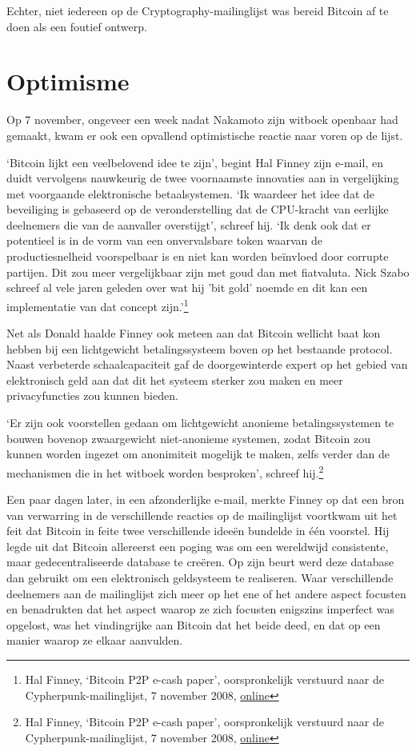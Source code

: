 \documentclass[
  a5paper,
  smalldemyvopaper,11pt,twoside,onecolumn,openright,extrafontsizes]{memoir}
\begin{document}
Echter, niet iedereen op de Cryptography-mailinglijst was bereid Bitcoin
af te doen als een foutief ontwerp.

\section{Optimisme}\label{optimisme}

Op 7 november, ongeveer een week nadat Nakamoto zijn witboek openbaar
had gemaakt, kwam er ook een opvallend optimistische reactie naar voren
op de lijst.

`Bitcoin lijkt een veelbelovend idee te zijn', begint Hal Finney zijn
e-mail, en duidt vervolgens nauwkeurig de twee voornaamste innovaties
aan in vergelijking met voorgaande elektronische betaalsystemen. `Ik
waardeer het idee dat de beveiliging is gebaseerd op de veronderstelling
dat de CPU-kracht van eerlijke deelnemers die van de aanvaller
overstijgt', schreef hij. `Ik denk ook dat er potentieel is in de vorm
van een onvervalsbare token waarvan de productiesnelheid voorspelbaar is
en niet kan worden beïnvloed door corrupte partijen. Dit zou meer
vergelijkbaar zijn met goud dan met fiatvaluta. Nick Szabo schreef al
vele jaren geleden over wat hij 'bit gold' noemde en dit kan een
implementatie van dat concept zijn.'\footnote{Hal Finney, `Bitcoin P2P
  e-cash paper', oorspronkelijk verstuurd naar de
  Cypherpunk-mailinglijst, 7 november 2008,
  \href{https://www.metzdowd.com/pipermail/cryptography/2008-November/014827.html}{online}}

Net als Donald haalde Finney ook meteen aan dat Bitcoin wellicht baat
kon hebben bij een lichtgewicht betalingssysteem boven op het bestaande
protocol. Naast verbeterde schaalcapaciteit gaf de doorgewinterde expert
op het gebied van elektronisch geld aan dat dit het systeem sterker zou
maken en meer privacyfuncties zou kunnen bieden.

`Er zijn ook voorstellen gedaan om lichtgewicht anonieme
betalingssystemen te bouwen bovenop zwaargewicht niet-anonieme systemen,
zodat Bitcoin zou kunnen worden ingezet om anonimiteit mogelijk te
maken, zelfs verder dan de mechanismen die in het witboek worden
besproken', schreef hij.\footnote{Hal Finney, `Bitcoin P2P e-cash
  paper', oorspronkelijk verstuurd naar de Cypherpunk-mailinglijst, 7
  november 2008,
  \href{https://www.metzdowd.com/pipermail/cryptography/2008-November/014827.html}{online}}

Een paar dagen later, in een afzonderlijke e-mail, merkte Finney op dat
een bron van verwarring in de verschillende reacties op de mailinglijst
voortkwam uit het feit dat Bitcoin in feite twee verschillende ideeën
bundelde in één voorstel. Hij legde uit dat Bitcoin allereerst een
poging was om een wereldwijd consistente, maar gedecentraliseerde
database te creëren. Op zijn beurt werd deze database dan gebruikt om
een elektronisch geldsysteem te realiseren. Waar verschillende
deelnemers aan de mailinglijst zich meer op het ene of het andere aspect
focusten en benadrukten dat het aspect waarop ze zich focusten enigszins
imperfect was opgelost, was het vindingrijke aan Bitcoin dat het beide
deed, en dat op een manier waarop ze elkaar aanvulden.
\end{document}
